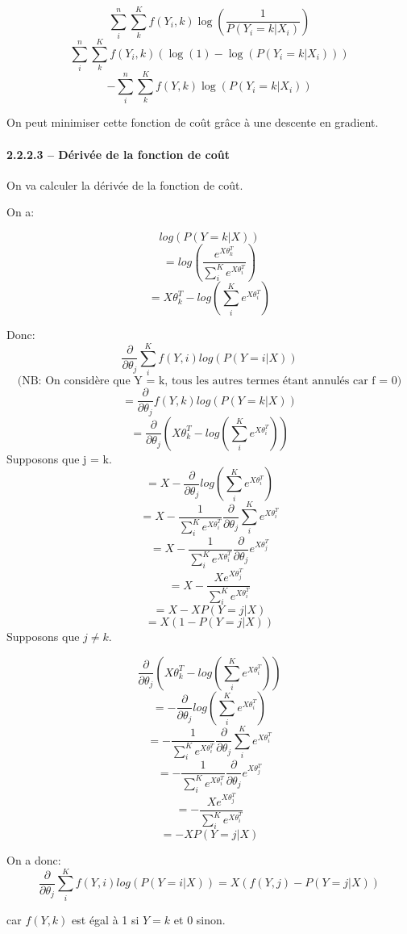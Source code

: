 \documentclass[
]{article}
\begin{document}
\[\sum_i^n \sum_k^K f(Y_i, k) \log(\frac{1}{P(Y_i = k | X_i)})\]
\[\sum_i^n \sum_k^K f(Y_i, k) (\log(1) - \log(P(Y_i = k | X_i)))\]
\[-\sum_i^n \sum_k^K f(Y, k)\log(P(Y_i = k | X_i))\]

On peut minimiser cette fonction de coût grâce à une descente en
gradient.

\paragraph{2.2.2.3 -- Dérivée de la fonction de
coût}\label{duxe9rivuxe9e-de-la-fonction-de-couxfbt-1}

On va calculer la dérivée de la fonction de coût.

On a:

\[log(P(Y = k | X))\]
\[=log\left(\frac{e^{X \theta_k^T}}{\sum_i^K e^{X\theta_i^T}}\right)\]
\[=X \theta_k^T - log\left(\sum_i^K e^{X \theta_i^T}\right)\]

Donc:
\[\frac{\partial}{\partial \theta_{j}} \sum_i^K f(Y, i)log(P(Y = i | X))\]
\[\text{(NB: On considère que Y = k, tous les autres termes étant annulés car f = 0)}\]
\[=\frac{\partial}{\partial \theta_{j}} f(Y, k)log(P(Y = k | X))\]
\[=\frac{\partial}{\partial \theta_{j}} \left(X \theta_{k}^T - log\left(\sum_i^K e^{X \theta_i^T}\right)\right) \]
Supposons que j = k.
\[=X - \frac{\partial}{\partial \theta_{j}}log\left(\sum_i^K e^{X \theta_i^T}\right) \]
\[=X - \frac{1}{\sum_i^K e^{X \theta_i^T}} \frac{\partial}{\partial \theta_{j}}\sum_i^K e^{X \theta_i^T} \]
\[=X - \frac{1}{\sum_i^K e^{X \theta_i^T}} \frac{\partial}{\partial \theta_{j}}e^{X \theta_j^T}\]
\[=X - \frac{X e^{X \theta_j^T}}{\sum_i^K e^{X \theta_i^T}}\]
\[=X - X P(Y = j | X)\] \[=X (1 - P(Y = j | X))\] Supposons que
\(j \neq k\).

\[\frac{\partial}{\partial \theta_{j}} \left(X \theta_{k}^T - log\left(\sum_i^K e^{X \theta_i^T}\right)\right) \]
\[= - \frac{\partial}{\partial \theta_{j}}log\left(\sum_i^K e^{X \theta_i^T}\right) \]
\[= - \frac{1}{\sum_i^K e^{X \theta_i^T}} \frac{\partial}{\partial \theta_{j}}\sum_i^K e^{X \theta_i^T} \]
\[= - \frac{1}{\sum_i^K e^{X \theta_i^T}} \frac{\partial}{\partial \theta_{j}}e^{X \theta_j^T} \]
\[= - \frac{Xe^{X \theta_j^T}}{\sum_i^K e^{X \theta_i^T}} \]
\[= -X P(Y = j | X)\]

On a donc:
\[\frac{\partial}{\partial \theta_{j}} \sum_i^K f(Y, i)log(P(Y = i | X)) = X(f(Y, j) - P(Y = j|X))\]

car \(f(Y, k)\) est égal à 1 si \(Y = k\) et 0 sinon.
\end{document}
